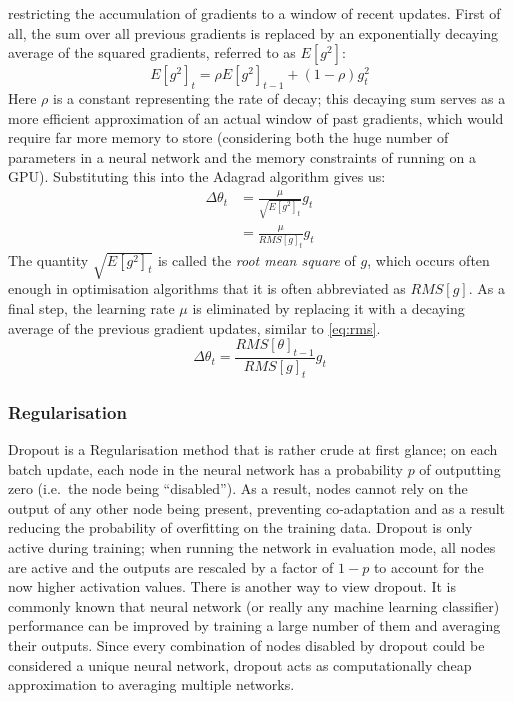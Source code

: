 restricting the accumulation of gradients to a window of recent updates. First
of all, the sum over all previous gradients is replaced by an exponentially
decaying average of the squared gradients, referred to as $E[g^2]$:
\begin{equation}\label{eq:rms}
  E[g^2]_t = \rho E[g^2]_{t-1} + (1 - \rho) g_t^2
\end{equation}
Here $\rho$ is a constant representing the rate of decay; this decaying sum
serves as a more efficient approximation of an actual window of past gradients,
which would require far more memory to store (considering both the huge number
of parameters in a neural network and the memory constraints of running on a GPU).
Substituting this into the Adagrad algorithm gives us:
\begin{align}
  \Delta\theta_t &= \frac{\mu}{\sqrt{E[g^2]_t}} g_{t} \\
		 &= \frac{\mu}{RMS[g]_t} g_{t}
\end{align}
The quantity $\sqrt{E[g^2]_t}$ is called the \emph{root mean square} of $g$,
which occurs often enough in optimisation algorithms that it is often
abbreviated as $RMS[g]$. As a final step, the learning rate $\mu$ is eliminated
by replacing it with a decaying average of the previous gradient updates,
similar to \cref{eq:rms}.
\begin{equation}
  \Delta\theta_t = \frac{RMS[\theta]_{t-1}}{RMS[g]_t} g_{t}
\end{equation}

\subsubsection{Regularisation}
Dropout\citep{dropout} is a Regularisation method that is rather crude at first
glance; on each batch update, each node in the neural network has a probability
$p$ of outputting zero (i.e.\ the node being ``disabled''). As a result, nodes
cannot rely on the output of any other node being present, preventing
co-adaptation and as a result reducing the probability of overfitting on the
training data. Dropout is only active during training; when running the network
in evaluation mode, all nodes are active and the outputs are rescaled by a
factor of $1 - p$ to account for the now higher activation values.
There is another way to view dropout. It is commonly known that neural network
(or really any machine learning classifier) performance can be improved by
training a large number of them and averaging their outputs. Since every
combination of nodes disabled by dropout could be considered a unique neural
network, dropout acts as computationally cheap approximation to averaging
multiple networks.

